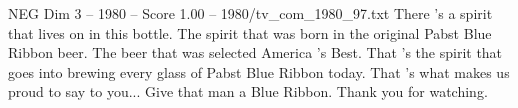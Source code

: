 \begin{textsample}{NEG Dim 3 – 1980 – Score 1.00 – 1980/tv\_com\_1980\_97.txt}  \label{ex:f3_neg_050}
There 's a spirit that lives on in this bottle.
The spirit that was born in the original Pabst Blue Ribbon beer.
The beer that was selected America 's Best.
That 's the spirit that goes into brewing every glass of Pabst Blue Ribbon today.
That 's what makes us proud to say to you...
Give that man a Blue Ribbon.
Thank you for watching.

\end{textsample}
